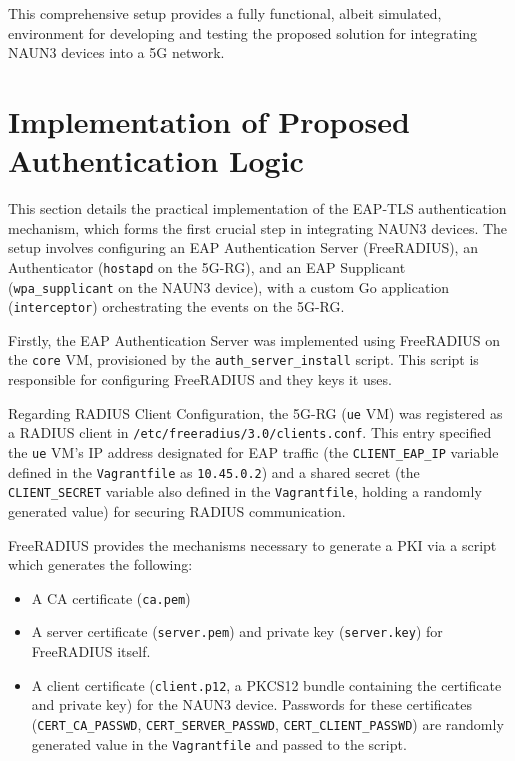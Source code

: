 This comprehensive setup provides a fully functional, albeit simulated, environment for developing and testing the proposed solution for integrating \ac{NAUN3} devices into a \ac{5G} network.

\section{Implementation of Proposed Authentication Logic}

This section details the practical implementation of the \ac{EAP-TLS} authentication mechanism, which forms the first crucial step in integrating \ac{NAUN3} devices. The setup involves configuring an \ac{EAP} Authentication Server (FreeRADIUS), an Authenticator (\texttt{hostapd} on the \ac{5G-RG}), and an \ac{EAP} Supplicant (\texttt{wpa\_supplicant} on the \ac{NAUN3} device), with a custom Go application (\texttt{interceptor}) orchestrating the events on the \ac{5G-RG}.

Firstly, the \ac{EAP} Authentication Server was implemented using FreeRADIUS on the \texttt{core} \ac{VM}, provisioned by the \texttt{auth\_server\_install} script. This script is responsible for configuring FreeRADIUS and they keys it uses.

Regarding \ac{RADIUS} Client Configuration, the \ac{5G-RG} (\texttt{ue} \ac{VM}) was registered as a \ac{RADIUS} client in \texttt{/etc/freeradius/3.0/clients.conf}. This entry specified the \texttt{ue} \ac{VM}'s \ac{IP} address designated for \ac{EAP} traffic (the \texttt{CLIENT\_EAP\_IP} variable defined in the \texttt{Vagrantfile} as \texttt{10.45.0.2}) and a shared secret (the \texttt{CLIENT\_SECRET} variable also defined in the \texttt{Vagrantfile}, holding a randomly generated value) for securing \ac{RADIUS} communication.

FreeRADIUS provides the mechanisms necessary to generate a \ac{PKI} via a script which generates the following:

\begin{itemize}
    \item A \ac{CA} certificate (\texttt{ca.pem})
    \item A server certificate (\texttt{server.pem}) and private key (\texttt{server.key}) for FreeRADIUS itself.
    \item A client certificate (\texttt{client.p12}, a \ac{PKCS12} bundle containing the certificate and private key) for the \ac{NAUN3} device. Passwords for these certificates (\texttt{CERT\_CA\_PASSWD}, \texttt{CERT\_SERVER\_PASSWD}, \texttt{CERT\_CLIENT\_PASSWD}) are randomly generated value in the \texttt{Vagrantfile} and passed to the script.
\end{itemize}

